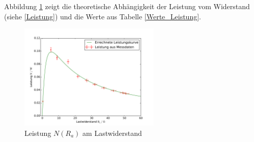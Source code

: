 \begin{center}

\label{Werte_Leistung}
\end{center}
Abbildung \ref{fig:Werte_Leistung} zeigt die theoretische Abhängigkeit der Leistung vom Widerstand (siehe \eqref{Leistung}) und die Werte aus Tabelle \ref{Werte_Leistung}.
\begin{figure}[h!]
	\centering
	\includegraphics[width=0.6\textwidth]{Leistungskurve.pdf}
	\caption{Leistung $N(R_a)$ am Lastwiderstand}
	\label{fig:Werte_Leistung}
\end{figure}




